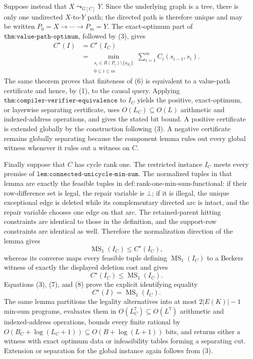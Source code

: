 Suppose instead that \(X\leadsto_{G[C]}Y\).  Since the underlying graph is a tree, there is only one undirected \(X\)-to-\(Y\) path; the directed path is therefore unique and may be written \(P_0=X\to\cdots\to P_m=Y\).  The exact-optimum part of \(\texttt{thm:value-path-optimum}\), followed by (3), gives
\[
 \begin{aligned}
 C^\star(I)
 &=C^\star(I_C)\\
 &=\min_{\substack{s_i\in R(P_i)\setminus\{a_{P_i}\}\\0\le i\le m}}
   \sum_{i=1}^{m}C_i(s_{i-1},s_i).                         \tag{6}
 \end{aligned}
\]
The same theorem proves that finiteness of (6) is equivalent to a value-path certificate and hence, by (1), to the causal query.  Applying \(\texttt{thm:compiler-verifier-equivalence}\) to \(I_C\) yields the positive, exact-optimum, or layerwise separating certificate, uses \(O(L_C)\subseteq O(L)\) arithmetic and indexed-address operations, and gives the stated bit bound.  A positive certificate is extended globally by the construction following (3).  A negative certificate remains globally separating because the component lemma rules out every global witness whenever it rules out a witness on \(C\).

Finally suppose that \(C\) has cycle rank one.  The restricted instance \(I_C\) meets every premise of \(\texttt{lem:connected-unicycle-min-sum}\).  The normalized tuples in that lemma are exactly the feasible tuples in \(\mathrm{def:rank\mbox{-}one\mbox{-}min\mbox{-}sum\mbox{-}functional}\): if their row-difference set is legal, the repair variable is \(\bot\); if it is illegal, the unique exceptional edge is deleted while its complementary directed arc is intact, and the repair variable chooses one edge on that arc.  The retained-parent hitting constraints are identical to those in the definition, and the support-row constraints are identical as well.  Therefore the normalization direction of the lemma gives
\[
 \operatorname{MS}_1(I_C)\le C^\star(I_C),                                 \tag{7}
\]
whereas its converse maps every feasible tuple defining \(\operatorname{MS}_1(I_C)\) to a Beckers witness of exactly the displayed deletion cost and gives
\[
 C^\star(I_C)\le\operatorname{MS}_1(I_C).                                  \tag{8}
\]
Equations (3), (7), and (8) prove the explicit identifying equality
\[
 C^\star(I)=\operatorname{MS}_1(I_C).                                       \tag{9}
\]
The same lemma partitions the legality alternatives into at most \(2|E(K)|-1\) min-sum programs, evaluates them in \(O(L_C^7)\subseteq O(L^7)\) arithmetic and indexed-address operations, bounds every finite rational by \(O(B_C+\log(L_C+1))\subseteq O(B+\log(L+1))\) bits, and returns either a witness with exact optimum data or infeasibility tables forming a separating cut.  Extension or separation for the global instance again follows from (3).

